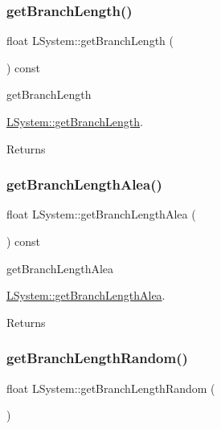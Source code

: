 \subsubsection{\texorpdfstring{get\+Branch\+Length()}{getBranchLength()}}
{\footnotesize\ttfamily float L\+System\+::get\+Branch\+Length (\begin{DoxyParamCaption}{ }\end{DoxyParamCaption}) const}



get\+Branch\+Length 

\hyperlink{classLSystem_a8d4fb387b953c1e98ee02d24ca7c9770}{L\+System\+::get\+Branch\+Length}.

\begin{DoxyReturn}{Returns}

\end{DoxyReturn}
\mbox{\label{classLSystem_a947039d67e95d2fcac3dea513c64ed39}} 
\subsubsection{\texorpdfstring{get\+Branch\+Length\+Alea()}{getBranchLengthAlea()}}
{\footnotesize\ttfamily float L\+System\+::get\+Branch\+Length\+Alea (\begin{DoxyParamCaption}{ }\end{DoxyParamCaption}) const}



get\+Branch\+Length\+Alea 

\hyperlink{classLSystem_a947039d67e95d2fcac3dea513c64ed39}{L\+System\+::get\+Branch\+Length\+Alea}.

\begin{DoxyReturn}{Returns}

\end{DoxyReturn}
\mbox{\label{classLSystem_a826543c6871f8cc26b0be7ad7c4c3f22}} 
\subsubsection{\texorpdfstring{get\+Branch\+Length\+Random()}{getBranchLengthRandom()}}
{\footnotesize\ttfamily float L\+System\+::get\+Branch\+Length\+Random (\begin{DoxyParamCaption}{ }\end{DoxyParamCaption})}



